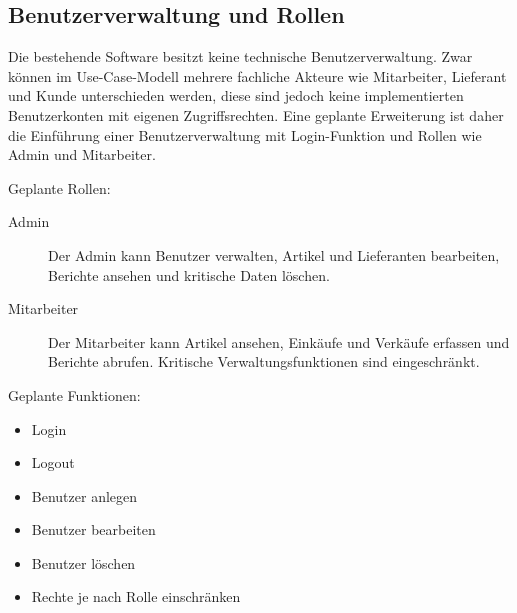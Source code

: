 \documentclass[12pt,a4paper]{article}
\begin{document}
	\subsection{Benutzerverwaltung und Rollen}
	
	Die bestehende Software besitzt keine technische Benutzerverwaltung. Zwar können
	im Use-Case-Modell mehrere fachliche Akteure wie Mitarbeiter, Lieferant und
	Kunde unterschieden werden, diese sind jedoch keine implementierten
	Benutzerkonten mit eigenen Zugriffsrechten. Eine geplante Erweiterung ist daher
	die Einführung einer Benutzerverwaltung mit Login-Funktion und Rollen wie Admin
	und Mitarbeiter.
	
	Geplante Rollen:
	
	\begin{description}
		\item[Admin]
		Der Admin kann Benutzer verwalten, Artikel und Lieferanten bearbeiten,
		Berichte ansehen und kritische Daten löschen.
		
		\item[Mitarbeiter]
		Der Mitarbeiter kann Artikel ansehen, Einkäufe und Verkäufe erfassen und
		Berichte abrufen. Kritische Verwaltungsfunktionen sind eingeschränkt.
	\end{description}
	
	Geplante Funktionen:
	
	\begin{itemize}
		\item Login
		\item Logout
		\item Benutzer anlegen
		\item Benutzer bearbeiten
		\item Benutzer löschen
		\item Rechte je nach Rolle einschränken
	\end{itemize}
	
	
	
\end{document}
